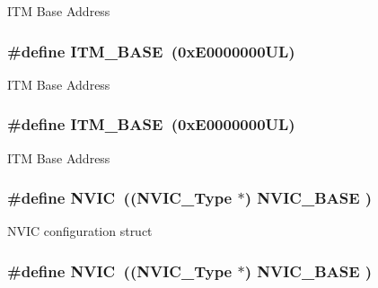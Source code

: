 I\-T\-M Base Address \hypertarget{group___c_m_s_i_s__core__base_gadd76251e412a195ec0a8f47227a8359e}{
\subsubsection[{I\-T\-M\-\_\-\-B\-A\-S\-E}]{\setlength{\rightskip}{0pt plus 5cm}\#define I\-T\-M\-\_\-\-B\-A\-S\-E~(0x\-E0000000\-U\-L)}}\label{group___c_m_s_i_s__core__base_gadd76251e412a195ec0a8f47227a8359e}
I\-T\-M Base Address \hypertarget{group___c_m_s_i_s__core__base_gadd76251e412a195ec0a8f47227a8359e}{
\subsubsection[{I\-T\-M\-\_\-\-B\-A\-S\-E}]{\setlength{\rightskip}{0pt plus 5cm}\#define I\-T\-M\-\_\-\-B\-A\-S\-E~(0x\-E0000000\-U\-L)}}\label{group___c_m_s_i_s__core__base_gadd76251e412a195ec0a8f47227a8359e}
I\-T\-M Base Address \hypertarget{group___c_m_s_i_s__core__base_gac8e97e8ce56ae9f57da1363a937f8a17}{
\subsubsection[{N\-V\-I\-C}]{\setlength{\rightskip}{0pt plus 5cm}\#define N\-V\-I\-C~(({\bf N\-V\-I\-C\-\_\-\-Type}      $\ast$)     {\bf N\-V\-I\-C\-\_\-\-B\-A\-S\-E}     )}}\label{group___c_m_s_i_s__core__base_gac8e97e8ce56ae9f57da1363a937f8a17}
N\-V\-I\-C configuration struct \hypertarget{group___c_m_s_i_s__core__base_gac8e97e8ce56ae9f57da1363a937f8a17}{
\subsubsection[{N\-V\-I\-C}]{\setlength{\rightskip}{0pt plus 5cm}\#define N\-V\-I\-C~(({\bf N\-V\-I\-C\-\_\-\-Type}      $\ast$)     {\bf N\-V\-I\-C\-\_\-\-B\-A\-S\-E}     )}}\label{group___c_m_s_i_s__core__base_gac8e97e8ce56ae9f57da1363a937f8a17}
